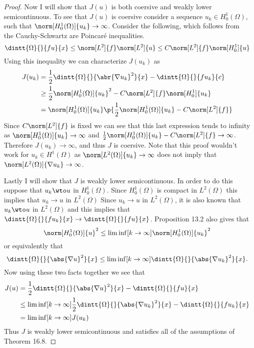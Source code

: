 \documentclass[11pt, oneside]{article}
\begin{document}
\begin{enumerate}
\begin{proof}
      Now I will show that $J(u)$ is both coersive and weakly lower
      semicontinuous.
      To see that $J(u)$ is coersive consider a sequence
      $u_k \in H^1_0(\Omega)$, such that $\norm[H^1_0(\Omega)]{u_k} \to \infty$.
      Consider the following, which follows from the Cauchy-Schwartz are
      Poincar\'e inequalities.
      \[
        \dintt{\Omega}{}{fu}{x} \le \norm[L^2]{f} \norm[L^2]{u} \le C\norm[L^2]{f} \norm[H^1_0]{u}
      \]
      Using this inequality we can characterize $J(u_k)$ as
      \begin{align*}
        J(u_k) &= \frac{1}{2} \dintt{\Omega}{}{\abr{\nabla u_k}^2}{x} - \dintt{\Omega}{}{f u_k}{c} \\
        &\ge \frac{1}{2} \norm[H^1_0(\Omega)]{u_k}^2 - C \norm[L^2]{f} \norm[H^1_0]{u_k} \\
        &= \norm[H^1_0(\Omega)]{u_k} \p{\frac{1}{2} \norm[H^1_0(\Omega)]{u_k} - C \norm[L^2]{f}} \\
      \end{align*}
      Since $C \norm[L^2]{f}$ is fixed we can see that this last expression
      tends to infinity as $\norm[H^1_0(\Omega)]{u_k} \to \infty$ and
      $\frac{1}{2} \norm[H^1_0(\Omega)]{u_k} - C \norm[L^2]{f} \to \infty$.
      Therefore $J(u_k) \to \infty$, and thus $J$ is coersive.
      Note that this proof wouldn't work for $u_k \in H^1(\Omega)$ as
      $\norm[L^2(\Omega)]{u_k} \to \infty$ does not imply that
      $\norm[L^2(\Omega)]{\nabla u_k} \to \infty$.

      Lastly I will show that $J$ is weakly lower semicontinuous.
      In order to do this suppose that $u_k \wto u$ in $H^1_0(\Omega)$.
      Since $H^1_0(\Omega)$ is compact in $L^2(\Omega)$ this implies that
      $u_k \to u$ in $L^2(\Omega)$
      Since $u_k \to u$ in $L^2(\Omega)$, it is also known that $u_k \wto u$ in
      $L^2(\Omega)$ and this implies that
      $\dintt{\Omega}{}{f u_k}{x} \to \dintt{\Omega}{}{f u}{x}$.
      Proposition 13.2 also gives that
      \[
        \norm[H^1_0(\Omega)]{u}^2 \le \liminf[k \to \infty]{\norm[H^1_0(\Omega)]{u_k}^2}
      \]
      or equivalently that
      \[
        \dintt{\Omega}{}{\abs{\nabla u}^2}{x} \le \liminf[k \to \infty]{\dintt{\Omega}{}{\abs{\nabla u_k}^2}{x}}.
      \]
      Now using these two facts together we see that
      \begin{align*}
        J(u) &= \frac{1}{2}\dintt{\Omega}{}{\abs{\nabla u}^2}{x} - \dintt{\Omega}{}{fu}{x} \\
        &\le \liminf[k \to \infty]{\frac{1}{2}\dintt{\Omega}{}{\abs{\nabla u_k}^2}{x} - \dintt{\Omega}{}{fu_k}{x}} \\
        &= \liminf[k \to \infty]{J(u_k)}
      \end{align*}
      Thus $J$ is weakly lower semicontinuous and satisfies all of the
      assumptions of Theorem 16.8.
    \end{proof}


\end{enumerate}
\end{document}
